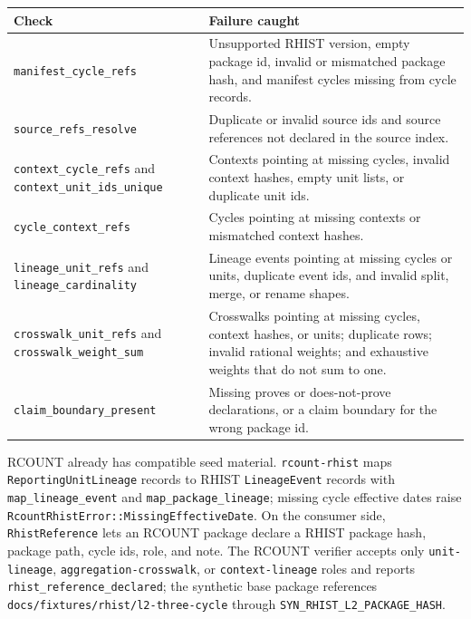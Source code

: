 \begin{center}
\small
\begin{tabularx}{\textwidth}{lX}
\toprule
Check & Failure caught \\
\midrule
\texttt{manifest\_cycle\_refs} & Unsupported RHIST version, empty package id, invalid or mismatched package hash, and manifest cycles missing from cycle records. \\
\texttt{source\_refs\_resolve} & Duplicate or invalid source ids and source references not declared in the source index. \\
\texttt{context\_cycle\_refs} and \texttt{context\_unit\_ids\_unique} & Contexts pointing at missing cycles, invalid context hashes, empty unit lists, or duplicate unit ids. \\
\texttt{cycle\_context\_refs} & Cycles pointing at missing contexts or mismatched context hashes. \\
\texttt{lineage\_unit\_refs} and \texttt{lineage\_cardinality} & Lineage events pointing at missing cycles or units, duplicate event ids, and invalid split, merge, or rename shapes. \\
\texttt{crosswalk\_unit\_refs} and \texttt{crosswalk\_weight\_sum} & Crosswalks pointing at missing cycles, context hashes, or units; duplicate rows; invalid rational weights; and exhaustive weights that do not sum to one. \\
\texttt{claim\_boundary\_present} & Missing proves or does-not-prove declarations, or a claim boundary for the wrong package id. \\
\bottomrule
\end{tabularx}
\end{center}

RCOUNT already has compatible seed material. \texttt{rcount-rhist} maps
\texttt{ReportingUnitLineage} records to RHIST \texttt{LineageEvent} records
with \texttt{map\_lineage\_event} and \texttt{map\_package\_lineage}; missing
cycle effective dates raise \texttt{RcountRhistError::MissingEffectiveDate}.
On the consumer side, \texttt{RhistReference} lets an RCOUNT package declare a
RHIST package hash, package path, cycle ids, role, and note. The RCOUNT
verifier accepts only \texttt{unit-lineage}, \texttt{aggregation-crosswalk}, or
\texttt{context-lineage} roles and reports
\texttt{rhist\_reference\_declared}; the synthetic base package references
\texttt{docs/fixtures/rhist/l2-three-cycle} through
\texttt{SYN\_RHIST\_L2\_PACKAGE\_HASH}.
